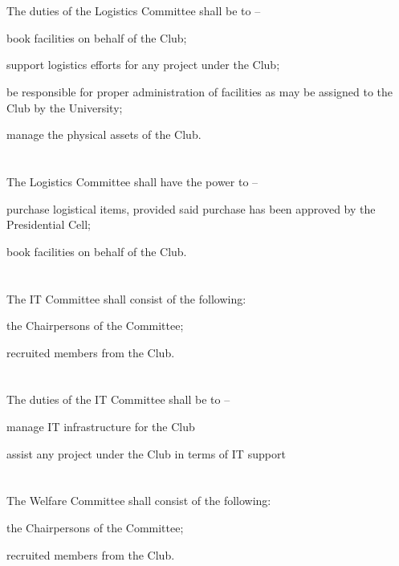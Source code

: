 \section{}
The duties of the Logistics Committee shall be to –
	\begin{legal}
	\item book facilities on behalf of the Club;
	\item support logistics efforts for any project under the Club;
	\item be responsible for proper administration of facilities as may be assigned to the Club by the University;
	\item manage the physical assets of the Club.
	\end{legal}

\section{}
The Logistics Committee shall have the power to –
	\begin{legal}
	\item purchase logistical items, provided said purchase has been approved by the Presidential Cell;
	\item book facilities on behalf of the Club.
	\end{legal}

\section{}
The IT Committee shall consist of the following:
	\begin{legal}
	\item the Chairpersons of the Committee;
	\item recruited members from the Club.
	\end{legal}

\section{}
The duties of the IT Committee shall be to –
	\begin{legal}
	\item manage IT infrastructure for the Club
	\item assist any project under the Club in terms of IT support
	\end{legal}

\section{}
The Welfare Committee shall consist of the following:
	\begin{legal}
	\item the Chairpersons of the Committee;
	\item recruited members from the Club.
	\end{legal}

